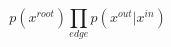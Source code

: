 \documentclass[preview, convert={density=300,size=1080x800,outext=.png}]{standalone}
\begin{document}
\begin{equation*}
    p(x^{root})\prod_{edge}p(x^{out}|x^{in})
\end{equation*}
\end{document}
